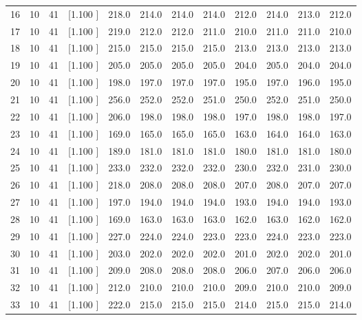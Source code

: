 \documentclass[12pt,a4paper]{article}
\begin{document}
\begin{center}
{\begin{tabular}{r r r r r r r r r r r r}
  16& 10& 41&[1.100     ]&   218.0&   214.0&   214.0&   214.0&   212.0&   214.0&   213.0&   212.0\\[-0.02in]
  17& 10& 41&[1.100     ]&   219.0&   212.0&   212.0&   211.0&   210.0&   211.0&   211.0&   210.0\\[-0.02in]
  18& 10& 41&[1.100     ]&   215.0&   215.0&   215.0&   215.0&   213.0&   213.0&   213.0&   213.0\\[-0.02in]
  19& 10& 41&[1.100     ]&   205.0&   205.0&   205.0&   205.0&   204.0&   205.0&   204.0&   204.0\\[-0.02in]
  20& 10& 41&[1.100     ]&   198.0&   197.0&   197.0&   197.0&   195.0&   197.0&   196.0&   195.0\\[-0.02in]
  21& 10& 41&[1.100     ]&   256.0&   252.0&   252.0&   251.0&   250.0&   252.0&   251.0&   250.0\\[-0.02in]
  22& 10& 41&[1.100     ]&   206.0&   198.0&   198.0&   198.0&   197.0&   198.0&   198.0&   197.0\\[-0.02in]
  23& 10& 41&[1.100     ]&   169.0&   165.0&   165.0&   165.0&   163.0&   164.0&   164.0&   163.0\\[-0.02in]
  24& 10& 41&[1.100     ]&   189.0&   181.0&   181.0&   181.0&   180.0&   181.0&   181.0&   180.0\\[-0.02in]
  25& 10& 41&[1.100     ]&   233.0&   232.0&   232.0&   232.0&   230.0&   232.0&   231.0&   230.0\\[-0.02in]
  26& 10& 41&[1.100     ]&   218.0&   208.0&   208.0&   208.0&   207.0&   208.0&   207.0&   207.0\\[-0.02in]
  27& 10& 41&[1.100     ]&   197.0&   194.0&   194.0&   194.0&   193.0&   194.0&   194.0&   193.0\\[-0.02in]
  28& 10& 41&[1.100     ]&   169.0&   163.0&   163.0&   163.0&   162.0&   163.0&   162.0&   162.0\\[-0.02in]
  29& 10& 41&[1.100     ]&   227.0&   224.0&   224.0&   223.0&   223.0&   224.0&   223.0&   223.0\\[-0.02in]
  30& 10& 41&[1.100     ]&   203.0&   202.0&   202.0&   202.0&   201.0&   202.0&   202.0&   201.0\\[-0.02in]
  31& 10& 41&[1.100     ]&   209.0&   208.0&   208.0&   208.0&   206.0&   207.0&   206.0&   206.0\\[-0.02in]
  32& 10& 41&[1.100     ]&   212.0&   210.0&   210.0&   210.0&   209.0&   210.0&   210.0&   209.0\\[-0.02in]
  33& 10& 41&[1.100     ]&   222.0&   215.0&   215.0&   215.0&   214.0&   215.0&   215.0&   214.0\\[-0.02in]

\end{tabular}}
\end{center}
\end{document}
